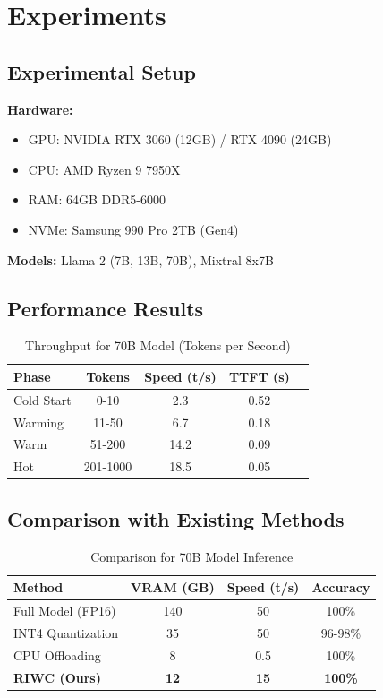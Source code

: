 \documentclass[twocolumn,10pt]{article}
\begin{document}
\section{Experiments}

\subsection{Experimental Setup}

\textbf{Hardware:}
\begin{itemize}
    \item GPU: NVIDIA RTX 3060 (12GB) / RTX 4090 (24GB)
    \item CPU: AMD Ryzen 9 7950X
    \item RAM: 64GB DDR5-6000
    \item NVMe: Samsung 990 Pro 2TB (Gen4)
\end{itemize}

\textbf{Models:} Llama 2 (7B, 13B, 70B), Mixtral 8x7B

\subsection{Performance Results}

\begin{table}[h]
\centering
\caption{Throughput for 70B Model (Tokens per Second)}
\begin{tabular}{lcccc}
\toprule
\textbf{Phase} & \textbf{Tokens} & \textbf{Speed (t/s)} & \textbf{TTFT (s)} \\
\midrule
Cold Start & 0-10 & 2.3 & 0.52 \\
Warming & 11-50 & 6.7 & 0.18 \\
Warm & 51-200 & 14.2 & 0.09 \\
Hot & 201-1000 & 18.5 & 0.05 \\
\bottomrule
\end{tabular}
\label{tab:throughput}
\end{table}

\subsection{Comparison with Existing Methods}

\begin{table}[h]
\centering
\caption{Comparison for 70B Model Inference}
\begin{tabular}{lccc}
\toprule
\textbf{Method} & \textbf{VRAM (GB)} & \textbf{Speed (t/s)} & \textbf{Accuracy} \\
\midrule
Full Model (FP16) & 140 & 50 & 100\% \\
INT4 Quantization & 35 & 50 & 96-98\% \\
CPU Offloading & 8 & 0.5 & 100\% \\
\textbf{RIWC (Ours)} & \textbf{12} & \textbf{15} & \textbf{100\%} \\
\bottomrule
\end{tabular}
\label{tab:comparison}
\end{table}
\end{document}
